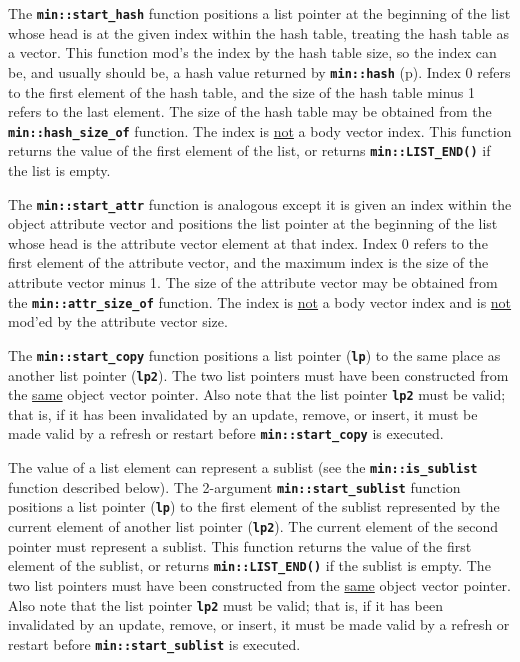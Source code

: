 \documentclass[12pt]{article}
\newcommand{\TT}[1]{{\tt \bfseries #1}}
\newcommand{\pagref}[1]{p\pageref{#1}}
\newcommand{\EOL}{\penalty \exhyphenpenalty}
\begin{document}
The \TT{min::\EOL start\_\EOL hash} function positions
a list pointer at the beginning of the
list whose head is at the given index within the hash table, treating the
hash table as a vector.  This function mod's the index by the hash table
size, so the index can be, and usually should be, a hash value returned
by \TT{min::\EOL hash} (\pagref{MIN::HASH}).
Index 0 refers to the first element of the hash table,
and the size of the hash table minus 1 refers to the last element.
The size of the hash table may be obtained from the
\TT{min::\EOL hash\_\EOL size\_\EOL of} function.
The index is \underline{not} a body vector index.
This function returns the value of the first
element of the list, or returns \TT{min::\EOL LIST\_\EOL END()}
if the list is empty.

The \TT{min::\EOL start\_\EOL attr} function is analogous except it is given
an index within the object attribute vector and positions the list pointer
at the beginning of the list whose head is the attribute vector element
at that index.  Index 0 refers to the first element of the attribute vector,
and the maximum index is the size of the attribute vector minus 1.
The size of the attribute vector may be obtained from the
\TT{min::\EOL attr\_\EOL size\_\EOL of} function.
The index is \underline{not} a body vector index and is \underline{not} mod'ed
by the attribute vector size.

The \TT{min::\EOL start\_\EOL copy} function
positions a list pointer (\TT{lp})
to the same place as another list pointer (\TT{lp2}).
The two list pointers must have been constructed from the \underline{same}
object vector pointer.
Also note that the list pointer \TT{lp2}
must be valid; that is, if it has been invalidated by
an update, remove, or insert, it must be made valid by a refresh or restart
before \TT{min::\EOL start\_\EOL copy} is executed.

The value of a list element can represent a sublist
(see the \TT{min::\EOL is\_\EOL sublist} function described below).
The 2-argument \TT{min::\EOL start\_\EOL sublist} function
positions a list pointer (\TT{lp})
to the first element of the sublist represented by the current
element of another list pointer (\TT{lp2}).
The current element of the second pointer must represent a sublist.
This function returns the value of the first element of
the sublist, or returns \TT{min::\EOL LIST\_\EOL END()}
if the sublist is empty.
The two list pointers must have been constructed from the \underline{same}
object vector pointer.
Also note that the list pointer \TT{lp2}
must be valid; that is, if it has been invalidated by
an update, remove, or insert, it must be made valid by a refresh or restart
before \TT{min::\EOL start\_\EOL sublist} is executed.
\end{document}
